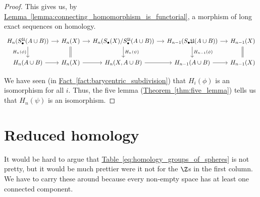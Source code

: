 \documentclass[main.tex]{subfiles}
\begin{document}
\begin{proof}
  This gives us, by \hyperref[lemma:connecting_homomorphism_is_functorial]{Lemma~\ref*{lemma:connecting_homomorphism_is_functorial}}, a morphism of long exact sequences on homology.
  \begin{equation*}
    \begin{tikzcd}[column sep=small]
      H_{n}(S_{\bullet}^{\mathfrak{U}}(A \cup B))
      \arrow[r]
      \arrow[d, swap, "H_{n}(\phi)"]
      & H_{n}(X)
      \arrow[r]
      \arrow[d, equals]
      & H_{n}(S_{\bullet}(X)/S_{\bullet}^{\mathfrak{U}}(A \cup B))
      \arrow[r]
      \arrow[d, "H_{n}(\psi)"]
      & H_{n-1}(S_{\bullet}\mathfrak{U}(A \cup B))
      \arrow[r]
      \arrow[d, "H_{n-1}(\phi)"]
      & H_{n-1}(X)
      \arrow[d, equals]
      \\
      H_{n}(A \cup B)
      \arrow[r]
      & H_{n}(X)
      \arrow[r]
      & H_{n}(X, A \cup B)
      \arrow[r]
      & H_{n-1}(A \cup B)
      \arrow[r]
      & H_{n-1}(X)
    \end{tikzcd}
  \end{equation*}

  We have seen (in \hyperref[fact:barycentric_subdivision]{Fact~\ref*{fact:barycentric_subdivision}}) that $H_{i}(\phi)$ is an isomorphism for all $i$. Thus, the five lemma (\hyperref[thm:five_lemma]{Theorem~\ref*{thm:five_lemma}}) tells us that $H_{n}(\psi)$ is an isomorphism.
\end{proof}

\section{Reduced homology}
\label{sec:reduced_homology}

It would be hard to argue that \hyperref[eq:homology_groups_of_spheres]{Table~\ref*{eq:homology_groups_of_spheres}} is not pretty, but it would be much prettier were it not for the $\Z$s in the first column. We have to carry these around because every non-empty space has at least one connected component.
\end{document}

